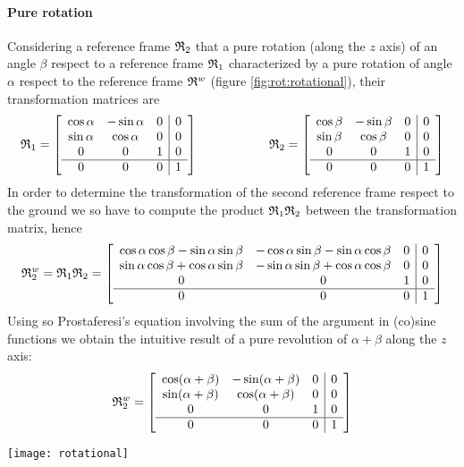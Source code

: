 		\paragraph{Pure rotation} Considering a reference frame $\mathfrak {R}_{2}$ that a pure rotation (along the $z$ axis) of an angle $\beta$ respect to a reference frame $\mathfrak {R}_{1}$ characterized by a pure rotation of angle $\alpha$ respect to the reference frame $\mathfrak{R}^w$ (figure \ref{fig:rot:rotational}), their transformation matrices are
		\[ \mathfrak {R}_{1} = \begin{bmatrix}  \begin{array}{c c c | c} \cos \alpha & -\sin \alpha & 0 & 0 \\ \sin\alpha & \cos \alpha & 0 & 0 \\ 0 & 0 & 1 & 0 \\ \hline 0 & 0 & 0 & 1 \end{array} \end{bmatrix} \hspace{2cm} \mathfrak {R}_{2} = \begin{bmatrix}  \begin{array}{c c c | c} \cos \beta & -\sin \beta & 0 & 0 \\ \sin\beta & \cos \beta & 0 & 0 \\ 0 & 0 & 1 & 0 \\ \hline 0 & 0 & 0 & 1 \end{array} \end{bmatrix} \]
		In order to determine the transformation of the second reference frame respect to the ground we so have to compute the product $\mathfrak {R}_{1} \mathfrak {R}_{2}$ between the transformation matrix, hence
		\[ \mathfrak {R}_{2}^w = \mathfrak {R}_{1} \mathfrak {R}_{2} = \begin{bmatrix}  \begin{array}{c c c | c} \cos \alpha \cos \beta -\sin\alpha\sin\beta & -\cos \alpha \sin \beta -\sin\alpha \cos \beta & 0 & 0 \\ \sin\alpha\cos\beta + \cos\alpha\sin\beta & -\sin\alpha\sin\beta + \cos\alpha\cos\beta & 0 & 0 \\ 0 & 0 & 1 & 0 \\ \hline 0 & 0 & 0 & 1 \end{array} \end{bmatrix} \]
		Using so Prostaferesi's equation involving the sum of the argument in (co)sine functions we obtain the intuitive result of a pure revolution of $\alpha + \beta$ along the $z$ axis:
		\[ \mathfrak {R}_{2}^w = \begin{bmatrix}  \begin{array}{c c c | c} \cos (\alpha +\beta) & -\sin (\alpha + \beta) & 0 & 0 \\ \sin(\alpha + \beta) & \cos (\alpha + \beta) & 0 & 0 \\ 0 & 0 & 1 & 0 \\ \hline 0 & 0 & 0 & 1 \end{array} \end{bmatrix} \]
		\begin{SCfigure}[2][bht]
			\centering \texttt{[image: rotational]}
			\caption{multiple transformations of pure rotation revolving the $z$ axis.} \label{fig:rot:rotational}
		\end{SCfigure}
		
